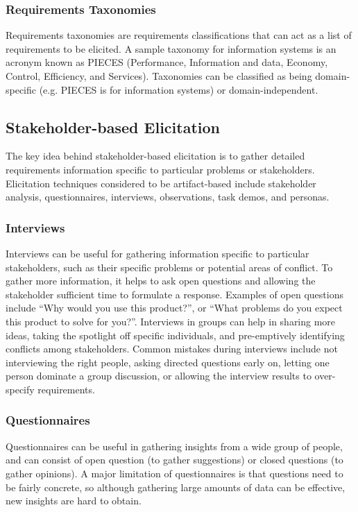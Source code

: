 \documentclass[12pt,titlepage]{article}
\begin{document}
      \subsubsection{Requirements Taxonomies}
        Requirements taxonomies are requirements classifications that can act as a list of requirements to be elicited. A sample taxonomy for information
        systems is an acronym known as PIECES (Performance, Information and data, Economy, Control, Efficiency, and Services). Taxonomies can be classified
        as being domain-specific (e.g. PIECES is for information systems) or domain-independent.

    \subsection{Stakeholder-based Elicitation}
      The key idea behind stakeholder-based elicitation is to gather detailed requirements information specific to particular problems or stakeholders.
      Elicitation techniques considered to be artifact-based include stakeholder analysis, questionnaires, interviews, observations, task demos, and personas.

      \subsubsection{Interviews}
        Interviews can be useful for gathering information specific to particular stakeholders, such as their specific problems or potential areas of conflict.
        To gather more information, it helps to ask open questions and allowing the stakeholder sufficient time to formulate a response. Examples of open questions
        include ``Why would you use this product?'', or ``What problems do you expect this product to solve for you?''. Interviews in groups can help in sharing more
        ideas, taking the spotlight off specific individuals, and pre-emptively identifying conflicts among stakeholders. Common mistakes during interviews include
        not interviewing the right people, asking directed questions early on, letting one person dominate a group discussion, or allowing the interview results to
        over-specify requirements.

      \subsubsection{Questionnaires}
        Questionnaires can be useful in gathering insights from a wide group of people, and can consist of open question (to gather suggestions) or closed questions
        (to gather opinions). A major limitation of questionnaires is that questions need to be fairly concrete, so although gathering large amounts of data can be
        effective, new insights are hard to obtain.
\end{document}

